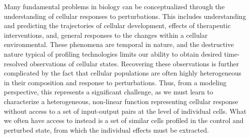 Many fundamental problems in biology can be conceptualized through the understanding of cellular responses to perturbations.
This includes understanding and predicting the trajectories of cellular development, effects of therapeutic interventions, and, general responses to the changes within a cellular environmental.
These phenomena are temporal in nature, and the destructive nature typical of profiling technologies limits our ability to obtain desired time-resolved observations of cellular states.
Recovering these observations is further complicated by the fact that cellular populations are often highly heterogeneous in their composition and response to perturbations.
Thus, from a modeling perspective, this represents a significant challenge, as we must learn to characterize a heterogeneous, non-linear function representing cellular response without access to a set of input-output pairs at the level of individual cells.
What we often have access to instead is a set of similar cells profiled in the control and perturbed state, from which the individual effects must be extracted.

